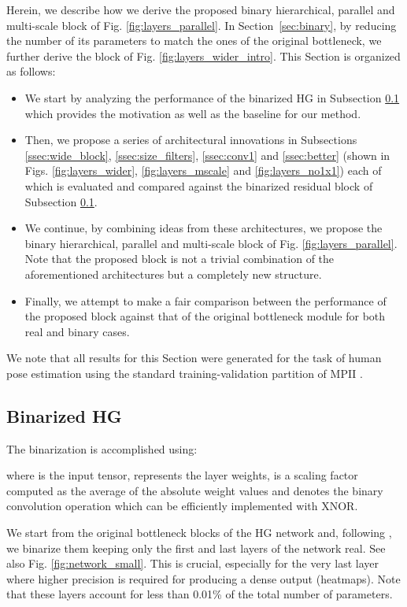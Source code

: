 \documentclass[10pt,journal,compsoc]{IEEEtran}
\begin{document}
Herein, we describe how we derive the proposed binary hierarchical, parallel and multi-scale block of Fig. \ref{fig:layers_parallel}. In Section~\ref{sec:binary}, by reducing the number of its parameters to match the ones of the original bottleneck, we further derive the block of Fig. \ref{fig:layers_wider_intro}. This Section is organized as follows:
\begin{itemize}\item
          We start by analyzing the performance of the binarized HG in Subsection \ref{ssec:naive} which provides the motivation as well as the baseline for our method.
    \item
          Then, we propose a series of architectural innovations in Subsections \ref{ssec:wide_block}, \ref{ssec:size_filters}, \ref{ssec:conv1} and \ref{ssec:better} (shown in Figs. \ref{fig:layers_wider}, \ref{fig:layers_mscale} and \ref{fig:layers_no1x1}) each of which is evaluated and compared against the binarized residual block of Subsection \ref{ssec:naive}.
    \item
          We continue, by combining ideas from these architectures, we propose the binary hierarchical, parallel and multi-scale block of Fig. \ref{fig:layers_parallel}. Note that the proposed block is not a trivial combination of the aforementioned architectures but a completely new structure.
    \item 
        {\color{black}Finally, we attempt to make a fair comparison between the performance of the proposed block against that of the original bottleneck module for both real and binary cases.}
\end{itemize}

We note that all results for this Section were generated for the task of human pose estimation   using the standard training-validation partition of MPII \cite{bulat2016human,newell2016stacked}.


\subsection{Binarized HG}\label{ssec:naive}

The binarization is accomplished using:

where  is the input tensor,  represents the layer weights, {\color{black} is a scaling factor computed as the average of the absolute weight values} and  denotes the binary convolution operation which can be efficiently implemented with XNOR.

We start from the original bottleneck blocks of the HG network and, following \cite{rastegari2016xnor}, we binarize them keeping only the first and last layers of the network real. See also Fig. \ref{fig:network_small}. This is crucial, especially for the very last layer where higher precision is required for producing a dense output (heatmaps). Note that these layers account for less than 0.01\% of the total number of parameters.
\end{document}
